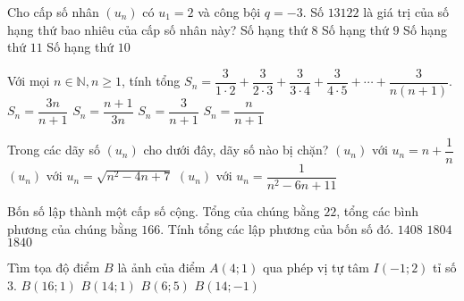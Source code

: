 \begin{ex}%
	Cho cấp số nhân $(u_n)$ có $u_1=2$ và công bội $q=-3$. Số $13122$ là giá trị của số hạng thứ bao nhiêu của cấp số nhân này?
	\choice
	{Số hạng thứ $8$}
	{\True Số hạng thứ $9$}
	{Số hạng thứ $11$}
	{ Số hạng thứ $10$}
\end{ex}

\begin{ex}%
	Với mọi $n\in \mathbb{N}, n\ge 1$, tính tổng $S_n=\dfrac{3}{1\cdot 2}+\dfrac{3}{2\cdot 3}+\dfrac{3}{3\cdot 4}+\dfrac{3}{4\cdot 5}+\cdots+\dfrac{3}{n(n+1)}$.
	\choice
	{\True $S_n=\dfrac{3n}{n+1}$}
	{$S_n=\dfrac{n+1}{3n}$}
	{$S_n=\dfrac{3}{n+1}$}
	{$S_n=\dfrac{n}{n+1}$}
\end{ex}

\begin{ex}%
	Trong các dãy số $(u_n)$ cho dưới đây, dãy số nào bị chặn?
	{$(u_n)$ với $u_n=n+\dfrac{1}{n}$}
	{$(u_n)$ với $u_n=\sqrt{n^2-4n+7}$}
	{\True $(u_n)$ với $u_n=\dfrac{1}{n^2-6n+11}$}
\end{ex}

\begin{ex}%
	Bốn số lập thành một cấp số cộng. Tổng của chúng bằng $22$, tổng các bình phương của chúng bằng $166$. Tính tổng các lập phương của bốn số đó.
	{\True $1408$}
	{$1804$}
	{$1840$}
\end{ex}

\begin{ex}%
	Tìm tọa độ điểm $B$ là ảnh của điểm $A(4;1)$ qua phép vị tự tâm  $I(-1;2)$ tỉ số $3$.
	\choice
	{$B(16;1)$}
	{$B(14;1)$}
	{$B(6;5)$}
	{\True $B(14;-1)$}
\end{ex}

